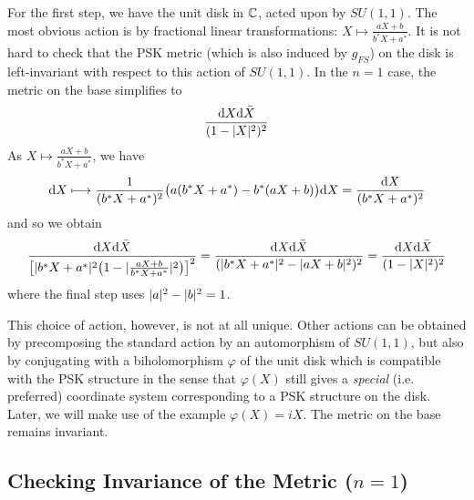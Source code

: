\documentclass[parskip=half]{scrartcl}
\begin{document}
For the first step, we have the unit disk in $\mathbb{C}$, acted upon by $SU(1,1)$. The most obvious action is by fractional linear transformations: $X\mapsto \frac{aX+b}{b^*X+a^*}$. It is not hard to check that the PSK metric (which is also induced by $g_{FS}$) on the disk is left-invariant with respect to this action of $SU(1,1)$. In the $n=1$ case, the metric on the base simplifies to
\begin{equation*}
	\frac{\mathrm{d} X \mathrm{d} \bar X}{(1-\lvert X \rvert^2)^2}
\end{equation*} 
As $X\mapsto \frac{aX+b}{b^*X+a^*}$, we have
\begin{equation*}
	\mathrm{d} X \longmapsto \frac{1}{(b^*X+a^*)^2}\big(a(b^*X+a^*) - b^*(aX+b)\big)\mathrm{d} X
	=\frac{\mathrm{d} X}{(b^*X+a^*)^2}
\end{equation*}
and so we obtain
\begin{equation*}
	\frac{\mathrm{d} X \mathrm{d} \bar X}{\big[\lvert b^*X+a^* \rvert^2\big(1-\lvert \frac{aX+b}{b^*X+a^*} \rvert^2\big)\big]^2}
	=\frac{\mathrm{d} X \mathrm{d} \bar X}{(\lvert b^*X+a^* \rvert^2-\lvert aX+b \rvert^2)^2}
	=\frac{\mathrm{d} X \mathrm{d} \bar X}{(1-\lvert X \rvert^2)^2}
\end{equation*}
where the final step uses $\lvert a \rvert^2-\lvert b \rvert^2=1$.

This choice of action, however, is not at all unique. Other actions can be obtained by precomposing the standard action by an automorphism of $SU(1,1)$, but also by conjugating with a biholomorphism $\varphi$ of the unit disk which is compatible with the PSK structure in the sense that $\varphi(X)$ still gives a \emph{special} (i.e. preferred) coordinate system corresponding to a PSK structure on the disk. Later, we will make use of the example $\varphi(X)=iX$. The metric on the base remains invariant.

\subsection{Checking Invariance of the Metric (\texorpdfstring{$n=1$}{n=1})}
\end{document}
